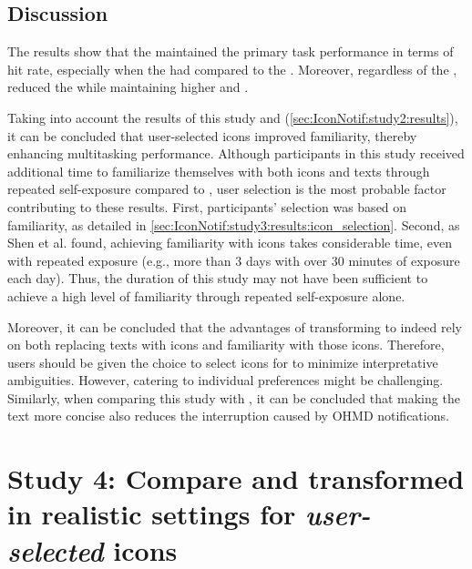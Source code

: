 \subsection{Discussion} 
\label{sec:IconNotif:study3:discussion}

The results show that the \iconformat{} maintained the primary task performance in terms of hit rate, especially when the \iconformat{} had \multicomplexity{} compared to the \textformat{}. Moreover, regardless of the \complexity{}, \iconformat{} reduced the \Interruption{} while maintaining higher \Comprehension{} and \Reaction{}.

Taking into account the results of this study and \studytwo{} (\autoref{sec:IconNotif:study2:results}), it can be concluded that user-selected icons improved familiarity, thereby enhancing multitasking performance.
Although participants in this study received additional time to familiarize themselves with both icons and texts through repeated self-exposure compared to \Studytwo{} \cite{shen_effects_2018}, user selection is the most probable factor contributing to these results. First, participants' selection was based on familiarity, as detailed in \autoref{sec:IconNotif:study3:results:icon_selection}. Second, as Shen et al. \cite{shen_effects_2018} found, achieving familiarity with icons takes considerable time, even with repeated exposure (e.g., more than 3 days with over 30 minutes of exposure each day). Thus, the duration of this study may not have been sufficient to achieve a high level of familiarity through repeated self-exposure alone.

Moreover, it can be concluded that the advantages of transforming \textformat{} to \iconformat{} indeed rely on both replacing texts with icons and familiarity with those icons. Therefore, users should be given the choice to select icons for  to minimize interpretative ambiguities. However, catering to individual preferences might be challenging. Similarly, when comparing this study with \studyone{}, it can be concluded that making the text more concise also reduces the interruption caused by OHMD notifications.


















\section{Study 4: Compare  and transformed  in realistic settings for \textit{user-selected} icons}
\label{sec:IconNotif:study4}

